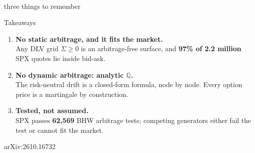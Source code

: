 \documentclass[aspectratio=169,11pt,handout]{beamer}
\newcommand{\Q}{\mathbb Q}
\newcommand{\divider}[2]{\begin{frame}\vspace*{0.35\textheight}{\Huge #1}\\[0.6em]{\large\color{gray}#2}\end{frame}}
\begin{document}
\divider{Takeaways}{three things to remember}

\begin{frame}{Takeaways}
\begin{enumerate}\setlength\itemsep{1.2em}
\item {\large\textbf{No static arbitrage, and it fits the market.}}\\
Any DLV grid $\Sigma\ge0$ is an arbitrage-free surface, and \textbf{97\% of 2.2 million} SPX quotes lie inside bid-ask.
\item {\large\textbf{No dynamic arbitrage: analytic $\Q$.}}\\
The risk-neutral drift is a closed-form formula, node by node. Every option price is a martingale by construction.
\item {\large\textbf{Tested, not assumed.}}\\
SPX passes \textbf{62{,}569} BHW arbitrage tests; competing generators either fail the test or cannot fit the market.
\end{enumerate}
\vfill
\begin{center}
arXiv:2610.16732
\end{center}
\end{frame}
\end{document}
